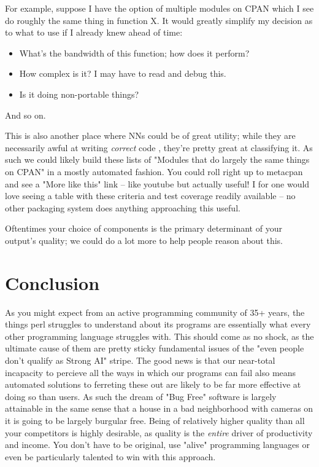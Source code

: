 \documentclass{article}
\begin{document}
For example, suppose I have the option of multiple modules on CPAN which I see do roughly the same thing in function X.
It would greatly simplify my decision as to what to use if I already knew ahead of time:
\begin{itemize}
\item What's the bandwidth of this function; how does it perform?
\item How complex is it?  I may have to read and debug this.
\item Is it doing non-portable things?
\end{itemize}
And so on.

This is also another place where NNs could be of great utility; while they are necessarily awful at writing \textit{correct} code \cite{copilot}, they're pretty great at classifying it.
As such we could likely build these lists of "Modules that do largely the same things on CPAN" in a mostly automated fashion.
You could roll right up to metacpan and see a "More like this" link -- like youtube but actually useful!
I for one would love seeing a table with these criteria and test coverage readily available -- no other packaging system does anything approaching this useful.

Oftentimes your choice of components is the primary determinant of your output's quality; we could do a lot more to help people reason about this.

\newpage
\section{Conclusion}

As you might expect from an active programming community of 35+ years, the things perl struggles to understand about its programs are essentially what every other programming language struggles with.
This should come as no shock, as the ultimate cause of them are pretty sticky fundamental issues of the "even people don't qualify as Strong AI" stripe.
The good news is that our near-total incapacity to percieve all the ways in which our programs can fail also means automated solutions to ferreting these out are likely to be far more effective at doing so than users.
As such the dream of "Bug Free" software is largely attainable in the same sense that a house in a bad neighborhood with cameras on it is going to be largely burgular free.
Being of relatively higher quality than all your competitors is highly desirable, as quality is the \textit{entire} driver of productivity and income.
You don't have to be original, use "alive" programming languages or even be particularly talented to win with this approach.
\end{document}
